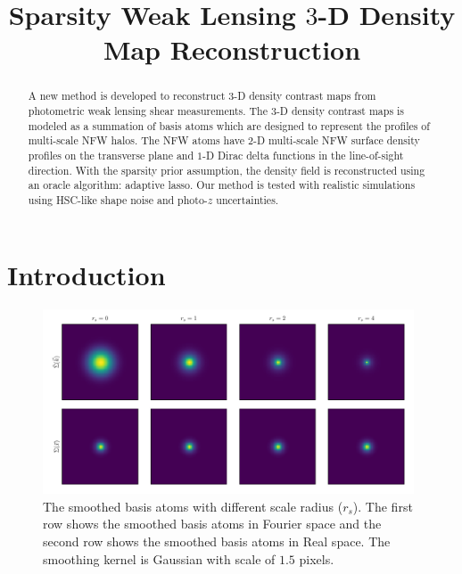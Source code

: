 \documentclass[twocolumn]{aastex62}
\newcommand \redColor{\color{red}}
\begin{document}
\title{Sparsity Weak Lensing $3$-D Density Map Reconstruction}

\begin{abstract}
A new method is developed to reconstruct $3$-D density contrast maps from photometric weak lensing shear measurements.
The $3$-D density contrast maps is modeled as a summation of basis atoms which are designed to represent the profiles of 
multi-scale NFW halos. The NFW atoms have $2$-D multi-scale NFW surface density profiles on the transverse plane and 
$1$-D Dirac delta functions in the line-of-sight direction. With the sparsity prior assumption, the density field 
is reconstructed using an oracle algorithm: adaptive lasso. Our method is tested with realistic simulations using HSC-like 
shape noise and photo-$z$ uncertainties.
{\redColor{Add descriptions on the outcomes of the test on the simulations.}}
\end{abstract}

\section{Introduction}

\begin{figure}[!ht]
    \includegraphics[width=0.98\textwidth]{nfwlet-atom-2D.pdf}
    \caption{The smoothed basis atoms with different scale radius ($r_s$). The first row shows the smoothed basis atoms in 
            Fourier space and the second row shows the smoothed basis atoms in Real space. The smoothing kernel is Gaussian
            with scale of $1.5$ pixels.} \label{fig-atoms2D}
\end{figure}
\end{document}
